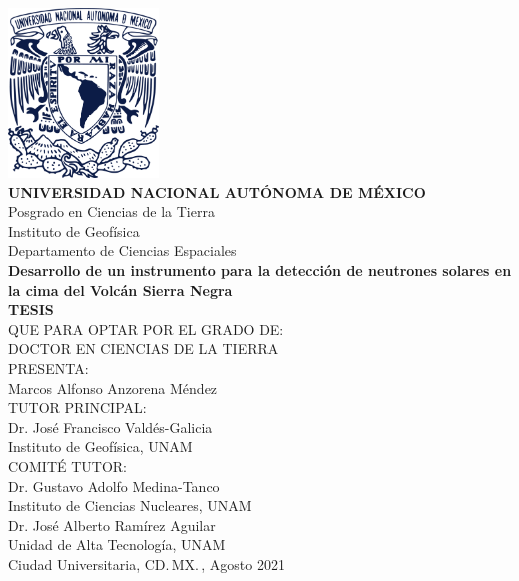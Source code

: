 \begin{titlepage}

\begin{center}

	\vspace{-1cm}
  \includegraphics[height=4.5cm]{unam.pdf}\\[20pt]
	\textbf{\Large UNIVERSIDAD NACIONAL AUTÓNOMA DE MÉXICO}\\
	\large Posgrado en Ciencias de la Tierra\\
	\large Instituto de Geofísica\\
	\large Departamento de Ciencias Espaciales\\[20pt]
	\textbf{\Large Desarrollo de un instrumento para la detección de neutrones solares en la cima
	del Volcán Sierra Negra}\\[20pt]
	\textbf{\Large TESIS}\\
  \large QUE PARA OPTAR POR EL GRADO DE:\\
  \large DOCTOR EN CIENCIAS DE LA TIERRA\\[20pt]
  \large PRESENTA:\\
	\large  Marcos Alfonso Anzorena Méndez\\[20pt]
  \large TUTOR PRINCIPAL:\\
  \large  Dr. José Francisco Valdés-Galicia\\
  \large  Instituto de Geofísica, UNAM\\[10pt]
  \large COMITÉ TUTOR:\\
  \large  Dr. Gustavo Adolfo Medina-Tanco\\
  \large  Instituto de Ciencias Nucleares, UNAM\\[10pt]
  \large  Dr. José Alberto Ramírez Aguilar\\
  \large  Unidad de Alta Tecnología, UNAM\\[20pt]

  Ciudad Universitaria, CD.\,MX.\,, Agosto 2021

\end{center}

\end{titlepage}
